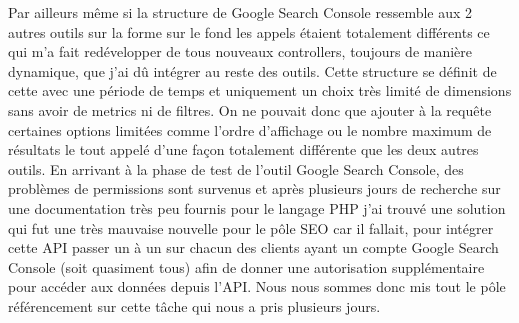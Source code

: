 \documentclass[12pt]{article}
\begin{document}
Par ailleurs même si la structure de Google Search Console ressemble aux 2 autres outils sur la forme sur le fond les appels étaient totalement différents ce qui m'a fait redévelopper de tous nouveaux controllers, toujours de manière dynamique, que j'ai dû intégrer au reste des outils. Cette structure se définit de cette avec une période de temps et uniquement un choix très limité de dimensions sans avoir de metrics ni de filtres. On ne pouvait donc que ajouter à la requête certaines options limitées comme l'ordre d'affichage ou le nombre maximum de résultats le tout appelé d'une façon totalement différente que les deux autres outils. En arrivant à la phase de test de l'outil Google Search Console, des problèmes de permissions sont survenus et après plusieurs jours de recherche sur une documentation très peu fournis pour le langage PHP j'ai trouvé une solution qui fut une très mauvaise nouvelle pour le pôle SEO car il fallait, pour intégrer cette API passer un à un sur chacun des clients ayant un compte Google Search Console (soit quasiment tous) afin de donner une autorisation supplémentaire pour accéder aux données depuis l'API. Nous nous sommes donc mis tout le pôle référencement sur cette tâche qui nous a pris plusieurs jours.
\end{document}
